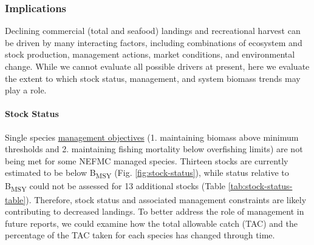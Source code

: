 \documentclass[
  10pt,
]{article}
\begin{document}
\subsubsection{Implications}\label{implications-1}

Declining commercial (total and seafood) landings and recreational harvest can be driven by many interacting factors, including combinations of ecosystem and stock production, management actions, market conditions, and environmental change. While we cannot evaluate all possible drivers at present, here we evaluate the extent to which stock status, management, and system biomass trends may play a role.

\paragraph{Stock Status}\label{stock-status}

Single species \href{https://noaa-edab.github.io/catalog/stock_status.html}{management objectives} (1. maintaining biomass above minimum thresholds and 2. maintaining fishing mortality below overfishing limits) are not being met for some NEFMC managed species. Thirteen stocks are currently estimated to be below B\textsubscript{MSY} (Fig. \ref{fig:stock-status}), while status relative to B\textsubscript{MSY} could not be assessed for 13 additional stocks (Table \ref{tab:stock-status-table}). Therefore, stock status and associated management constraints are likely contributing to decreased landings. To better address the role of management in future reports, we could examine how the total allowable catch (TAC) and the percentage of the TAC taken for each species has changed through time.
\end{document}
